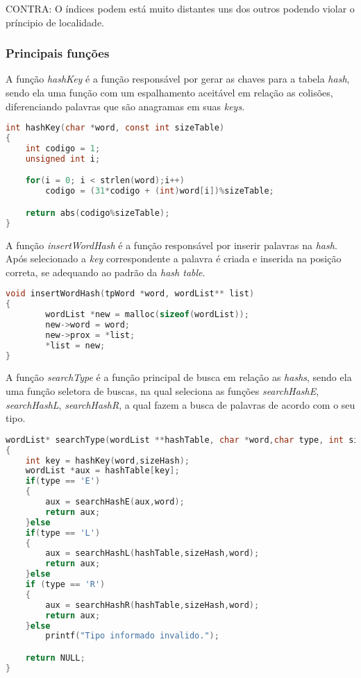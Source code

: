 \documentclass[
	11pt,				%
	oneside,			%
	a4paper,			%
	english,			%
	brazil,				%
	]{article}
\begin{document}
CONTRA: O índices podem está muito distantes uns dos outros podendo violar o príncipio de localidade.

\subsubsection{Principais funções}
A função \textit{hashKey} é a função responsável por gerar as chaves para a tabela \textit{hash}, sendo ela uma função com um espalhamento aceitável em relação as colisões, diferenciando palavras que são anagramas em suas \textit{keys}.
\begin{lstlisting}[language=C, caption=Função hash key]
int hashKey(char *word, const int sizeTable)
{
    int codigo = 1;
    unsigned int i;

    for(i = 0; i < strlen(word);i++)
        codigo = (31*codigo + (int)word[i])%sizeTable;

    return abs(codigo%sizeTable);
}
\end{lstlisting}

A função \textit{insertWordHash} é a função responsável por inserir palavras na \textit{hash}. Após selecionado a \textit{key} correspondente a palavra é criada e inserida na posição correta, se adequando ao padrão da \textit{hash table}.
\begin{lstlisting}[language=C, caption=Função inserir palavra na Hash]
void insertWordHash(tpWord *word, wordList** list)
{
        wordList *new = malloc(sizeof(wordList));
        new->word = word;
        new->prox = *list;
        *list = new;
}
\end{lstlisting}

A função \textit{searchType} é a função principal de busca em relação as \textit{hashs}, sendo ela uma função seletora de buscas, na qual seleciona as funções \textit{searchHashE}, \textit{searchHashL}, \textit{searchHashR}, a qual fazem a busca de palavras de acordo com o seu tipo.
\begin{lstlisting}[language=C, caption=Função de busca]
wordList* searchType(wordList **hashTable, char *word,char type, int sizeHash)
{
	int key = hashKey(word,sizeHash);
	wordList *aux = hashTable[key];
	if(type == 'E')
	{
		aux = searchHashE(aux,word);
		return aux;
	}else
	if(type == 'L')
	{
		aux = searchHashL(hashTable,sizeHash,word);
		return aux;
	}else
	if (type == 'R')
	{
		aux = searchHashR(hashTable,sizeHash,word);
		return aux;
	}else
		printf("Tipo informado invalido.");

	return NULL;
}
\end{lstlisting}
\end{document}
